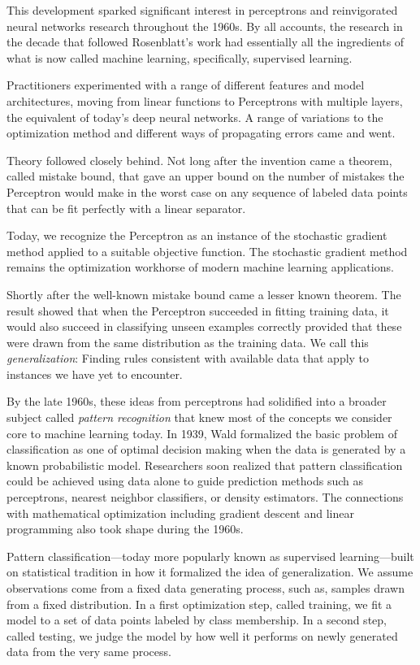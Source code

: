 \documentclass{tufte-book}
\begin{document}
This development sparked significant interest in perceptrons and
reinvigorated neural networks research throughout the 1960s. By all
accounts, the research in the decade that followed Rosenblatt's work had
essentially all the ingredients of what is now called machine learning,
specifically, supervised learning.

Practitioners experimented with a range of different features and model
architectures, moving from linear functions to Perceptrons with multiple
layers, the equivalent of today's deep neural networks. A range of
variations to the optimization method and different ways of propagating
errors came and went.

Theory followed closely behind. Not long after the invention came a
theorem, called mistake bound, that gave an upper bound on the number of
mistakes the Perceptron would make in the worst case on any sequence of
labeled data points that can be fit perfectly with a linear separator.

Today, we recognize the Perceptron as an instance of the stochastic
gradient method applied to a suitable objective function. The stochastic
gradient method remains the optimization workhorse of modern machine
learning applications.

Shortly after the well-known mistake bound came a lesser known theorem.
The result showed that when the Perceptron succeeded in fitting training
data, it would also succeed in classifying unseen examples correctly
provided that these were drawn from the same distribution as the
training data. We call this \emph{generalization}: Finding rules
consistent with available data that apply to instances we have yet to
encounter.

By the late 1960s, these ideas from perceptrons had solidified into a
broader subject called \emph{pattern recognition} that knew most of the
concepts we consider core to machine learning today. In 1939, Wald
formalized the basic problem of classification as one of optimal
decision making when the data is generated by a known probabilistic
model. Researchers soon realized that pattern classification could be
achieved using data alone to guide prediction methods such as
perceptrons, nearest neighbor classifiers, or density estimators. The
connections with mathematical optimization including gradient descent
and linear programming also took shape during the 1960s.

Pattern classification---today more popularly known as supervised
learning---built on statistical tradition in how it formalized the idea
of generalization. We assume observations come from a fixed data
generating process, such as, samples drawn from a fixed distribution. In
a first optimization step, called training, we fit a model to a set of
data points labeled by class membership. In a second step, called
testing, we judge the model by how well it performs on newly generated
data from the very same process.
\end{document}
